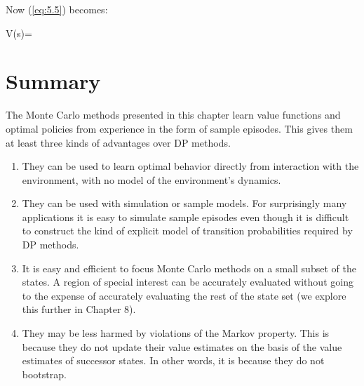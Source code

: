 Now (\ref{eq:5.5}) becomes:

\begin{myequation}{5.15}
    V(s)=
\end{myequation}

\section{Summary}
The Monte Carlo methods presented in this chapter learn value functions and optimal
policies from experience in the form of sample episodes.
This gives them at least three kinds of advantages over DP methods.
\begin{enumerate}
    \item They can be used to learn optimal behavior directly from interaction with the
    environment, with no model of the environment’s dynamics.
    \item They can be used with simulation or sample models.
    For surprisingly many applications it is easy to simulate sample episodes even though
    it is difficult to construct the kind of explicit model of transition probabilities
    required by DP methods.
    \item It is easy and efficient to focus Monte Carlo methods on a small subset of the states.
    A region of special interest can be accurately evaluated without going to the expense of
    accurately evaluating the rest of the state set (we explore this further in Chapter 8).
    \item They may be less harmed by violations of the Markov property.
    This is because they do not update their value estimates on the basis of the value
    estimates of successor states.
    In other words, it is because they do not bootstrap.
\end{enumerate}

